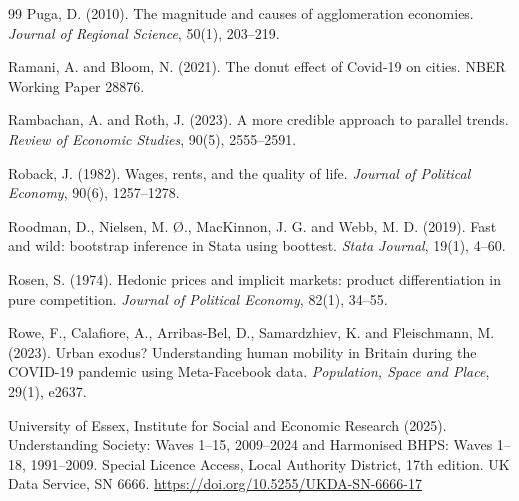 \documentclass[11pt,a4paper]{article}
\begin{document}
\begin{thebibliography}{99}
Puga, D. (2010). The magnitude and causes of agglomeration economies. \textit{Journal of Regional Science}, 50(1), 203--219.

Ramani, A. and Bloom, N. (2021). The donut effect of Covid-19 on cities. NBER Working Paper 28876.

Rambachan, A. and Roth, J. (2023). A more credible approach to parallel trends. \textit{Review of Economic Studies}, 90(5), 2555--2591.

Roback, J. (1982). Wages, rents, and the quality of life. \textit{Journal of Political Economy}, 90(6), 1257--1278.

Roodman, D., Nielsen, M. {\O}., MacKinnon, J. G. and Webb, M. D. (2019). Fast and wild: bootstrap inference in Stata using boottest. \textit{Stata Journal}, 19(1), 4--60.

Rosen, S. (1974). Hedonic prices and implicit markets: product differentiation in pure competition. \textit{Journal of Political Economy}, 82(1), 34--55.

Rowe, F., Calafiore, A., Arribas-Bel, D., Samardzhiev, K. and Fleischmann, M. (2023). Urban exodus? Understanding human mobility in Britain during the COVID-19 pandemic using Meta-Facebook data. \textit{Population, Space and Place}, 29(1), e2637.

University of Essex, Institute for Social and Economic Research (2025). Understanding Society: Waves 1--15, 2009--2024 and Harmonised BHPS: Waves 1--18, 1991--2009. Special Licence Access, Local Authority District, 17th edition. UK Data Service, SN 6666. \url{https://doi.org/10.5255/UKDA-SN-6666-17}

\end{thebibliography}
\end{document}
